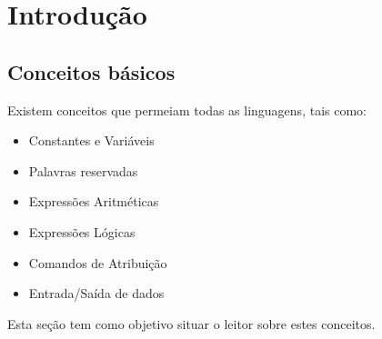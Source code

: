 \chapter{Introdução}
\section{Conceitos básicos}
Existem conceitos que permeiam todas as linguagens, tais como:
\begin{itemize}
    \item Constantes e Variáveis
    \item Palavras reservadas
    \item Expressões Aritméticas
    \item Expressões Lógicas
    \item Comandos de Atribuição
    \item Entrada/Saída de dados
\end{itemize}
Esta seção tem como objetivo situar o leitor sobre estes conceitos.
